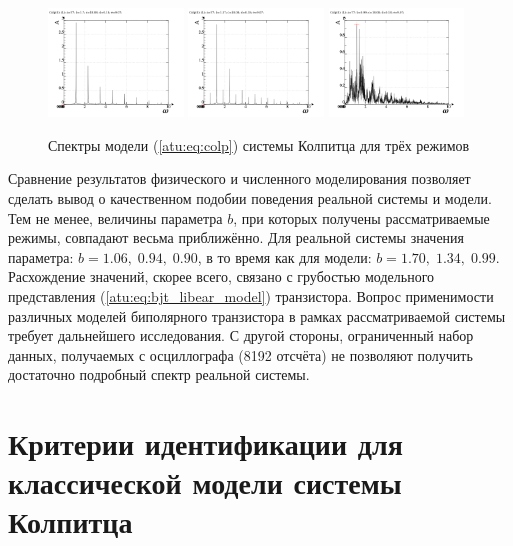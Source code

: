 \begin{figure}[htb!]
 \centerline{
   \includegraphics[width=0.32\textwidth]{p/mod/colp_f-p_f_b=1x70.png}
   \includegraphics[width=0.32\textwidth]{p/mod/colp_f-p_f_b=1x37.png}
   \includegraphics[width=0.32\textwidth]{p/mod/colp_f-p_f_b=0x99.png}
 }
  \caption{Спектры модели (\ref{atu:eq:colp}) системы Колпитца для трёх режимов}
  \label{atu:f:colp_model_f}
\end{figure}

Сравнение результатов физического и численного моделирования позволяет сделать вывод
о качественном подобии поведения реальной системы и модели.
Тем не менее, величины параметра $b$, при которых получены
рассматриваемые режимы, совпадают весьма приближённо.
Для реальной системы значения параметра: $b = 1.06, \; 0.94, \; 0.90 $, в то время как
для модели: $b = 1.70, \; 1.34, \; 0.99 $.
Расхождение значений, скорее всего, связано с грубостью модельного представления (\ref{atu:eq:bjt_libear_model}) транзистора.
Вопрос применимости различных моделей биполярного транзистора в рамках рассматриваемой системы
требует дальнейшего исследования.
С другой стороны, ограниченный набор данных, получаемых с осциллографа  (8192 отсчёта) не позволяют
получить достаточно подробный спектр реальной системы.


\section{Критерии идентификации для классической модели системы Колпитца}  %

